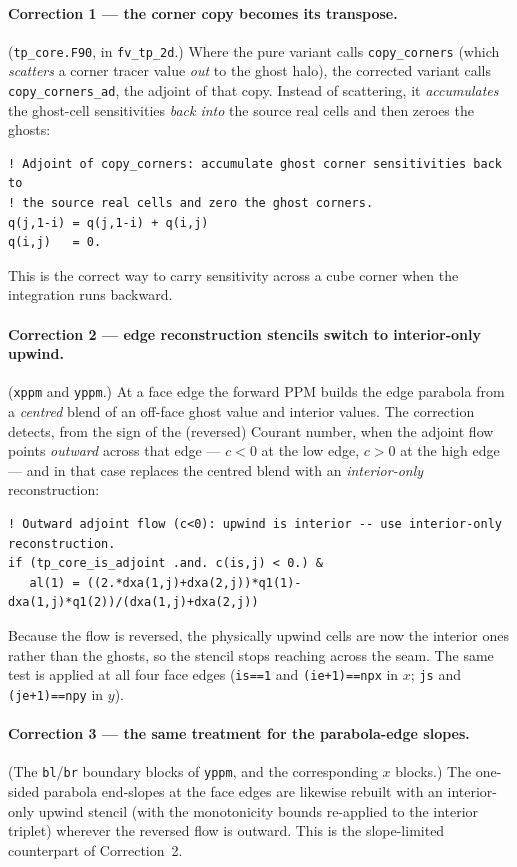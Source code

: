 \documentclass[11pt]{article}
\newcommand{\code}[1]{\texttt{#1}}
\begin{document}
\paragraph{Correction 1 --- the corner copy becomes its transpose.}
(\code{tp\_core.F90}, in \code{fv\_tp\_2d}.) Where the pure variant calls
\code{copy\_corners} (which \emph{scatters} a corner tracer value \emph{out} to
the ghost halo), the corrected variant calls \code{copy\_corners\_ad}, the
adjoint of that copy. Instead of scattering, it \emph{accumulates} the ghost-cell
sensitivities \emph{back into} the source real cells and then zeroes the ghosts:
\begin{lstlisting}
! Adjoint of copy_corners: accumulate ghost corner sensitivities back to
! the source real cells and zero the ghost corners.
q(j,1-i) = q(j,1-i) + q(i,j)
q(i,j)   = 0.
\end{lstlisting}
This is the correct way to carry sensitivity across a cube corner when the
integration runs backward.

\paragraph{Correction 2 --- edge reconstruction stencils switch to interior-only
upwind.} (\code{xppm} and \code{yppm}.) At a face edge the forward PPM builds the
edge parabola from a \emph{centred} blend of an off-face ghost value and interior
values. The correction detects, from the sign of the (reversed) Courant number,
when the adjoint flow points \emph{outward} across that edge --- $c<0$ at the low
edge, $c>0$ at the high edge --- and in that case replaces the centred blend with
an \emph{interior-only} reconstruction:
\begin{lstlisting}
! Outward adjoint flow (c<0): upwind is interior -- use interior-only reconstruction.
if (tp_core_is_adjoint .and. c(is,j) < 0.) &
   al(1) = ((2.*dxa(1,j)+dxa(2,j))*q1(1)-dxa(1,j)*q1(2))/(dxa(1,j)+dxa(2,j))
\end{lstlisting}
Because the flow is reversed, the physically upwind cells are now the interior
ones rather than the ghosts, so the stencil stops reaching across the seam. The
same test is applied at all four face edges (\code{is==1} and
\code{(ie+1)==npx} in $x$; \code{js} and \code{(je+1)==npy} in $y$).

\paragraph{Correction 3 --- the same treatment for the parabola-edge slopes.}
(The \code{bl}/\code{br} boundary blocks of \code{yppm}, and the corresponding
$x$ blocks.) The one-sided parabola end-slopes at the face edges are likewise
rebuilt with an interior-only upwind stencil (with the monotonicity bounds
re-applied to the interior triplet) wherever the reversed flow is outward. This
is the slope-limited counterpart of Correction~2.
\end{document}
